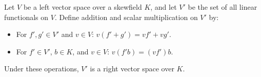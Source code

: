 Let $V$ be a left vector space over a skewfield $K$, and let $V'$ be the set of all linear functionals on $V$. Define addition and scalar multiplication on $V'$ by:
\begin{itemize}
\item For $f', g' \in V'$ and $v \in V$: $v(f' + g') = vf' + vg'$.
\item For $f' \in V'$, $b \in K$, and $v \in V$: $v(f'b) = (vf')b$.
\end{itemize}
Under these operations, $V'$ is a right vector space over $K$.
